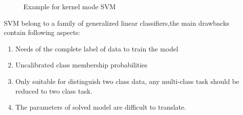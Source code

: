 \documentclass[a4paper,12pt]{article}
\begin{document}
\begin{figure}[H]
\centering 
{}
\caption{Example for kernel mode SVM\autocite{patel_2019}}
\label{Fig.main}
\end{figure}

SVM belong to a family of generalized linear classifiers,the main drawbacks contain following aspects\parencite{wiki:svm}:
\begin{enumerate}
    \item Needs of the complete label of data to train the model
    \item Uncalibrated class membership probabilities
    \item Only suitable for distinguish two class data, any multi-class task should be reduced to two class task. 
    \item The parameters of solved model are difficult to translate.
\end{enumerate}
\end{document}
